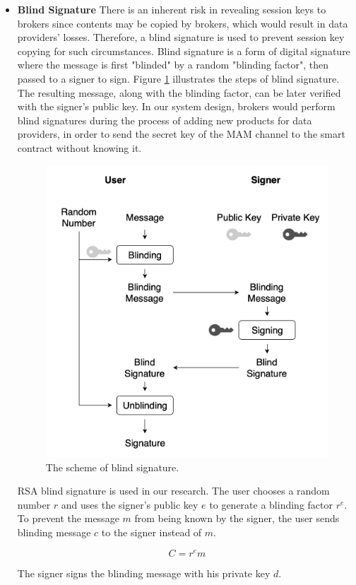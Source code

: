 \documentclass[journal,article,applsci,submit,moreauthors,pdftex]{Definitions/mdpi}
\begin{document}
\begin{itemize}[leftmargin=*,labelsep=5.8mm]
\item \textbf{Blind Signature}
There is an inherent risk in revealing session keys to brokers since contents may be copied by brokers, which would result in data providers' losses. Therefore, a blind signature is used to prevent session key copying for such circumstances. Blind signature\cite{blindSig} is a form of digital signature where the message is first "blinded" by a random "blinding factor", then passed to a signer to sign. Figure \ref{fig:blind_signature} illustrates the steps of blind signature. The resulting message, along with the blinding factor, can be later verified with the signer's public key. In our system design, brokers would perform blind signatures during the process of adding new products for data providers, in order to send the secret key of the MAM channel to the smart contract without knowing it.

\begin{figure}[h]
	\centering
	\includegraphics[width=3.3 in]{blind_signature}
	\caption{The scheme of blind signature.}
	\label{fig:blind_signature}
\end{figure}

RSA blind signature\cite{cryptoNote} is used in our research. The user chooses a random number $r$ and uses the signer's public key $e$ to generate a blinding factor $r^e$. To prevent the message $m$ from being known by the signer, the user sends blinding message $c$ to the signer instead of $m$.

\begin{equation}
C = r^e m
\end{equation}

The signer signs the blinding message with his private key $d$.


\end{itemize}
\end{document}

